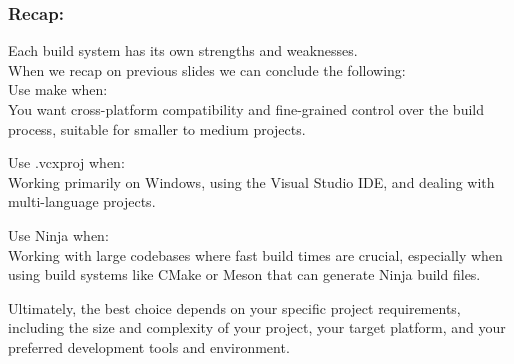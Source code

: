 \documentclass{beamer}
\begin{document}
\begin{frame}
\frametitle{Recap: }
\footnotesize
   Each build system has its own strengths and weaknesses. \\
   When we recap on previous slides we can conclude the following: \\ \bigskip
    Use make when:\\
        You want cross-platform compatibility and fine-grained control over the build process, suitable for smaller to medium projects.\\ \bigskip

    Use .vcxproj when:\\
        Working primarily on Windows, using the Visual Studio IDE, and dealing with multi-language projects.\\ \bigskip

    Use Ninja when: \\  
        Working with large codebases where fast build times are crucial, especially when using build systems like CMake or Meson that can generate Ninja build files. \\ \bigskip

Ultimately, the best choice depends on your specific project requirements, including the size and complexity of your project, your target platform, and your preferred development tools and environment.
\end{frame}
\end{document}
